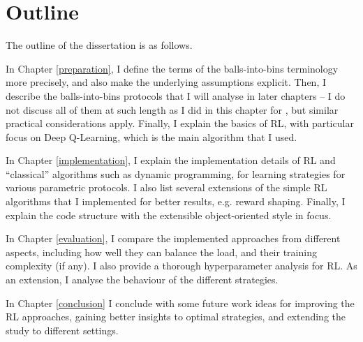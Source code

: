 

\section{Outline}

The outline of the dissertation is as follows.


In Chapter \ref{preparation}, I define the terms of the balls-into-bins terminology more precisely, and also make the underlying assumptions explicit. Then, I describe the balls-into-bins protocols that I will analyse in later chapters -- I do not discuss all of them at such length as I did in this chapter for \TwoThinning, but similar practical considerations apply. Finally, I explain the basics of RL, with particular focus on Deep Q-Learning, which is the main algorithm that I used.


In Chapter \ref{implementation}, I explain the implementation details of RL and ``classical'' algorithms such as dynamic programming, for learning strategies for various parametric protocols. I also list several extensions of the simple RL algorithms that I implemented for better results, e.g. reward shaping. Finally, I explain the code structure with the extensible object-oriented style in focus.


In Chapter \ref{evaluation}, I compare the implemented approaches from different aspects, including how well they can balance the load, and their training complexity (if any). I also provide a thorough hyperparameter analysis for RL. As an extension, I analyse the behaviour of the different strategies. 


In Chapter \ref{conclusion} I conclude with some future work ideas for improving the RL approaches, gaining better insights to optimal strategies, and extending the study to different settings.